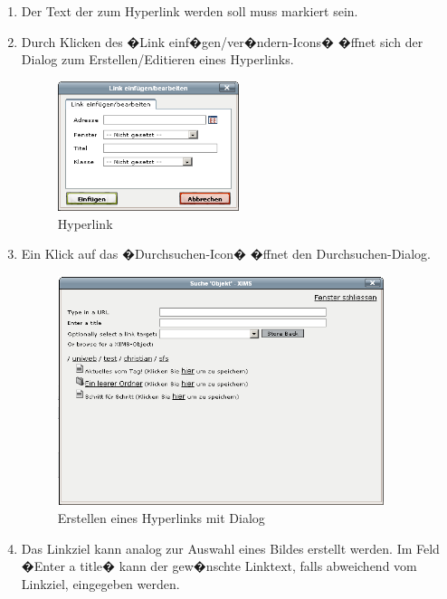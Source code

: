 \begin{enumerate}
\item {Der Text der zum Hyperlink werden soll muss markiert sein.}
\item {Durch Klicken des �Link einf�gen/ver�ndern-Icons� �ffnet sich
    der Dialog zum Erstellen/Editieren eines Hyperlinks.}

  \begin{figure}[!ht]
    \centering
    \includegraphics[width=0.5\textwidth]{./images/insertlink.png}
    \caption{Hyperlink }
    \label{fig:hyperlinkdialog}
  \end{figure}

\item {Ein Klick auf das �Durchsuchen-Icon� �ffnet den Durchsuchen-Dialog.}
  
  \begin{figure}[!ht]
    \centering
    \includegraphics[width=0.9\textwidth]{./images/browselink.png}
    \caption{Erstellen eines Hyperlinks mit Dialog}
    \label{fig:linkerstellendialog}
  \end{figure}

\item {Das Linkziel kann analog zur Auswahl eines Bildes erstellt werden. Im Feld �Enter a title� kann der gew�nschte Linktext, falls
    abweichend vom Linkziel, eingegeben werden.

}
\end{enumerate}
